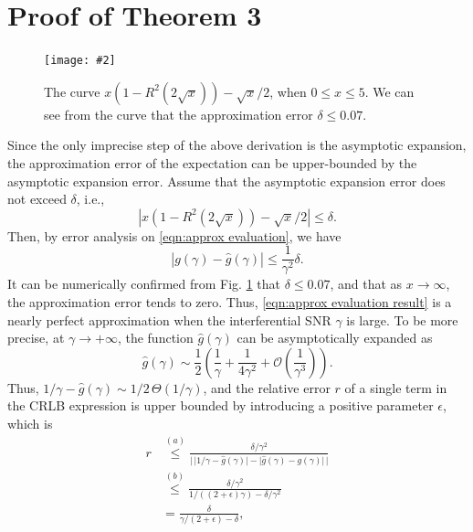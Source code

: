 \documentclass[journal,twocolumn]{IEEEtran}
\theoremstyle{nonumberplain}
\newcommand{\myincludegraphics}[2][width=1\linewidth]{\texttt{[image: \#2]}}
\newcommand{\myincludegraphics}[2][width=0.8\linewidth]{\texttt{[image: \#2]}}
\begin{document}
\section{Proof of \textbf{Theorem 3}}
\label{Proof of Theorem 3}
    \begin{figure}[t]
        \centering
        \myincludegraphics{figures/asymptotic_expansion.pdf}
        \caption{The curve $x(1-R^2(2\sqrt{x}))-\sqrt{x}/2$, when $0\leq x\leq 5$. We can see from the curve that the approximation error $\delta \leq 0.07$.}
        \label{fig:asymptotic_expansion}
    \end{figure}
    Since the only imprecise step of the above derivation is the asymptotic expansion, the approximation error of the expectation can be upper-bounded by the asymptotic expansion error. Assume that the asymptotic expansion error does not exceed $\delta$, i.e.,
    \begin{equation}
        \left\vert x\left(1-R^2(2\sqrt{x})\right)-\sqrt{x}/2 \right\vert \leq \delta.
        \label{eqn:asymptotic error}
    \end{equation}
    Then, by error analysis on \eqref{eqn:approx evaluation}, we have 
    \begin{equation}
        \left| g(\gamma) - \hat{g}(\gamma)\right| \leq \frac{1}{\gamma^2} \delta. 
    \end{equation}
    It can be numerically confirmed from Fig. \ref{fig:asymptotic_expansion} that $\delta \leq 0.07$, and that as $x\to \infty$, the approximation error tends to zero. Thus, \eqref{eqn:approx evaluation result} is a nearly perfect approximation when the interferential SNR $\gamma$ is large. To be more precise, at $\gamma \to +\infty$, the function $\hat{g}(\gamma)$ can be asymptotically expanded as
    \begin{equation}
        \hat{g}(\gamma) \sim \frac{1}{2}\left(\frac{1}{\gamma} + \frac{1}{4\gamma^2} + \mathcal O(\frac{1}{\gamma^3})\right).
        \label{eqn:g hat asymptotic expansion}
    \end{equation}
    Thus, $1/\gamma - \hat{g}(\gamma) \sim 1/2\,\Theta (1/\gamma)$, and the relative error $r$ of a single term in the CRLB expression is upper bounded by introducing a positive parameter $\epsilon$, which is
    \begin{equation}
        \begin{aligned}
        r & \overset{(a)}{\leq} \frac{\delta/\gamma^2}{\lvert \,\lvert 1/\gamma - \hat{g}(\gamma)\rvert - \lvert \hat{g}(\gamma) -  g(\gamma)\rvert\,\rvert} \\
        & \overset{(b)}{\leq} \frac{\delta/\gamma^2}{1/((2+\epsilon)\gamma) - \delta/\gamma^2} \\
        & = \frac{\delta}{\gamma/(2+\epsilon) - \delta}, \\
        \end{aligned}
        \label{eqn:upper bound of r}
    \end{equation}
\end{document}
